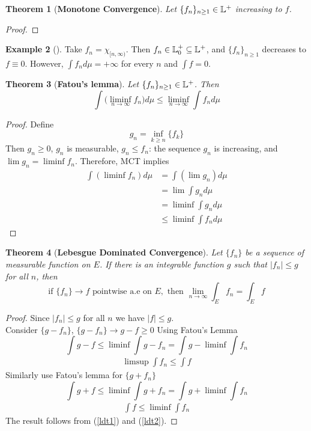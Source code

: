\documentclass[	DIV=calc,paper=a4,fontsize=11pt]{scrartcl}	 	%
\newtheorem{thm}{Theorem}[section]
\theoremstyle{definition}
\newtheorem{exmp}[thm]{Example}
\theoremstyle{plain}
\theoremstyle{remark}
\begin{document}
\begin{thm}[\textbf{Monotone Convergence}]
Let $\{f_n\}_{n\ge1}\in \Bbb L^+$ increasing to $f$.
\end{thm}

\begin{proof}
\end{proof}

\begin{exmp}[]
Take $f_n=\chi_{[n,\infty)}$. Then $f_n\in \Bbb L^{+}_0\subseteq\Bbb L^+$, and $\{f_n\}_{n\ge1}$ decreases to $f\equiv 0$. However, $\int f_nd\mu=+\infty$ for every $n$ and $\int f=0$.
\end{exmp}

\begin{thm}[\textbf{Fatou's lemma}]
Let $\{f_n\}_{n\ge1}\in \Bbb L^+$. Then
\[\int\biggl(\liminf_{n\to\infty}f_n\biggl)d\mu\le \liminf_{n\to\infty}\int f_nd\mu\]
\end{thm}
\begin{proof}
Define
\[g_n=\inf_{k\ge n}\{f_k\}\]
Then $g_n\ge0$, $g_n$ is measurable, $g_n\le f_n$: the sequence $g_n$ is increasing, and $\lim g_n=\liminf f_n$. Therefore, MCT implies
\begin{align*}
\int (\liminf f_n)d\mu &= \int(\lim g_n)d\mu\\
                       &= \lim \int g_nd\mu\\
                       &= \liminf\int g_nd\mu\\
                       &\le \liminf\int f_nd\mu \tag{since $g_n\le f_n$.}
\end{align*}
\end{proof}
\begin{thm}[\textbf{Lebesgue Dominated Convergence}]
Let $\{f_n\}$ be a sequence of measurable function on $E$. If there is an integrable function $g$ such that $|f_n|\le g$ for all $n$, then
\[\text{if }\{f_n\}\to f\text{ pointwise a.e on }E,\text{ then } \lim_{n\to \infty}\int_E f_n=\int_E f\]
\end{thm}
\begin{proof}
Since $|f_n|\le g$ for all $n$ we have $|f|\le g$.\\  Consider $\{g-f_n\}$, $\{g-f_n\}\to g-f\ge 0$
Using Fatou's Lemma
\[\int g-f\le \liminf \int g-f_n=\int g-\liminf \int f_n\]
\begin{align}\label{ldt1}
\limsup\int f_n\le \int f
\end{align}
Similarly use Fatou's lemma for $\{g+f_n\}$
\[\int g+f\le \liminf \int g+f_n=\int g+\liminf \int f_n\]
\begin{align}\label{ldt2}
\int f \le \liminf \int f_n
\end{align}
The result follows from (\ref{ldt1}) and (\ref{ldt2}).
\end{proof}
\end{document}
